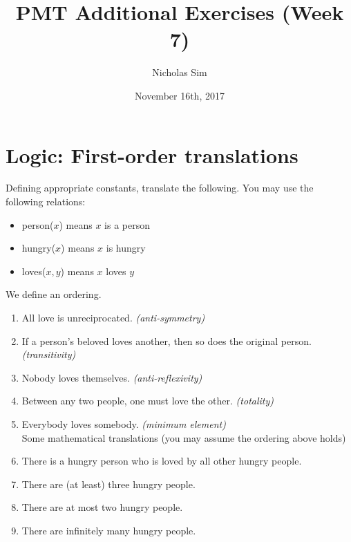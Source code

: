 \documentclass[10pt,a4paper]{article}
\begin{document}
\title{PMT Additional Exercises (Week 7)}
\author{Nicholas Sim}
\date{November 16th, 2017}
\maketitle{}



\section{Logic: First-order translations}
Defining appropriate constants, translate the following. You may use the following relations:

\begin{itemize}
    \item person(\(x\)) means \(x\) is a person
    \item hungry(\(x\)) means \(x\) is hungry
    \item loves(\(x, y\)) means \(x\) loves \(y\)
\end{itemize}

We define an ordering.
\begin{enumerate}
    \item All love is unreciprocated. \emph{(anti-symmetry)}
    \item If a person's beloved loves another, then so does the original person. \emph{(transitivity)}
    \item Nobody loves themselves. \emph{(anti-reflexivity)}
    \item Between any two people, one must love the other. \emph{(totality)}
    \item Everybody loves somebody. \emph{(minimum element)} \\

    Some mathematical translations (you may assume the ordering above holds)
    \item There is a hungry person who is loved by all other hungry people.

    \item There are (at least) three hungry people.

    \item There are at most two hungry people.

    \item There are infinitely many hungry people.
\end{enumerate}
\end{document}
